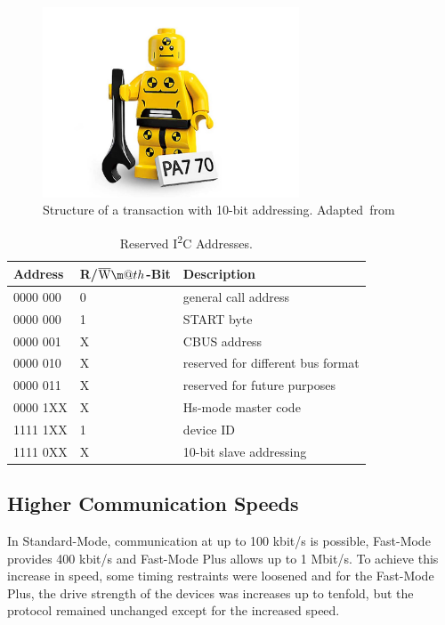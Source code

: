 \documentclass[journal]{IEEEtran}
\makeatletter
\newcommand{\twi}{I\textsuperscript{2}C\xspace}
\newcommand*{\textoverline}[1]{$\overline{\hbox{#1}}\m@th$}
\makeatother
\begin{document}
\begin{figure}[!t]
\centering
\includegraphics[width=3in]{dummy}
\caption{Structure of a transaction with 10-bit addressing. Adapted~from~\cite{i2c_standard}}
\label{i2c_10_bit_addressing}
\end{figure}

\begin{table}[!t]
\renewcommand{\arraystretch}{1.3}
\caption{Reserved \twi Addresses.\cite{i2c_standard}}
\label{i2c_addresses}
\centering
\begin{tabular}{lll}
\hline
Address & R/\textoverline{W}-Bit & Description\\
\hline
0000 000 & 0 & general call address\\
0000 000 & 1 & START byte\\
0000 001 & X & CBUS address\\
0000 010 & X & reserved for different bus format\\
0000 011 & X & reserved for future purposes\\
0000 1XX & X & Hs-mode master code\\
1111 1XX & 1 & device ID\\
1111 0XX & X & 10-bit slave addressing\\
\hline
\end{tabular}
\end{table}

\subsection{Higher Communication Speeds}
In Standard-Mode, communication at up to 100 kbit/s is possible, Fast-Mode provides 400 kbit/s and Fast-Mode Plus allows up to 1 Mbit/s. To achieve this increase in speed, some timing restraints were loosened and for the Fast-Mode Plus, the drive strength of the devices was increases up to tenfold, but the protocol remained unchanged except for the increased speed.
\end{document}
